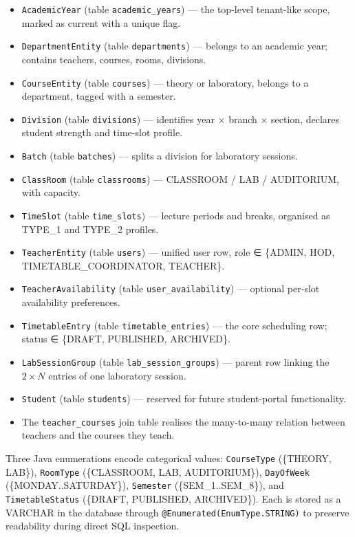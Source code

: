 \begin{itemize}
    \item \texttt{AcademicYear} (table \texttt{academic\_years}) --- the top-level tenant-like scope, marked as current with a unique flag.
    \item \texttt{DepartmentEntity} (table \texttt{departments}) --- belongs to an academic year; contains teachers, courses, rooms, divisions.
    \item \texttt{CourseEntity} (table \texttt{courses}) --- theory or laboratory, belongs to a department, tagged with a semester.
    \item \texttt{Division} (table \texttt{divisions}) --- identifies year $\times$ branch $\times$ section, declares student strength and time-slot profile.
    \item \texttt{Batch} (table \texttt{batches}) --- splits a division for laboratory sessions.
    \item \texttt{ClassRoom} (table \texttt{classrooms}) --- CLASSROOM / LAB / AUDITORIUM, with capacity.
    \item \texttt{TimeSlot} (table \texttt{time\_slots}) --- lecture periods and breaks, organised as TYPE\_1 and TYPE\_2 profiles.
    \item \texttt{TeacherEntity} (table \texttt{users}) --- unified user row, role ∈ \{ADMIN, HOD, TIMETABLE\_COORDINATOR, TEACHER\}.
    \item \texttt{TeacherAvailability} (table \texttt{user\_availability}) --- optional per-slot availability preferences.
    \item \texttt{TimetableEntry} (table \texttt{timetable\_entries}) --- the core scheduling row; status ∈ \{DRAFT, PUBLISHED, ARCHIVED\}.
    \item \texttt{LabSessionGroup} (table \texttt{lab\_session\_groups}) --- parent row linking the $2 \times N$ entries of one laboratory session.
    \item \texttt{Student} (table \texttt{students}) --- reserved for future student-portal functionality.
    \item The \texttt{teacher\_courses} join table realises the many-to-many relation between teachers and the courses they teach.
\end{itemize}

Three Java enumerations encode categorical values: \texttt{CourseType} (\{THEORY, LAB\}), \texttt{RoomType} (\{CLASSROOM, LAB, AUDITORIUM\}), \texttt{DayOfWeek} (\{MONDAY..SATURDAY\}), \texttt{Semester} (\{SEM\_1..SEM\_8\}), and \texttt{TimetableStatus} (\{DRAFT, PUBLISHED, ARCHIVED\}). Each is stored as a VARCHAR in the database through \texttt{@Enumerated(EnumType.STRING)} to preserve readability during direct SQL inspection.

